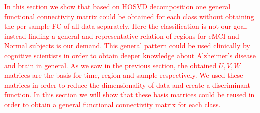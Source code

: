 \documentclass[preprint,12pt]{elsarticle}
\begin{document}

%	


\textcolor{red}{In this section we show that based on HOSVD decomposition one general functional connectivity matrix could be obtained for each class without obtaining the per-sample FC of all data separately. Here the classification is not our goal, instead  finding a general and representative
	relation of regions for eMCI and Normal subjects is our demand. This general pattern could be used clinically by  cognitive scientists in order to obtain deeper knowledge about Alzheimer's disease and brain in general.}
%
\textcolor{red}{As we saw in the previous section, the obtained $U,V,W$ matrices are the basis for time, region and sample respectively. We used these matrices in order to reduce the dimensionality of data and create a discriminant function. In this section we will show that these basis matrices could be reused in order to obtain a general functional connectivity matrix for each class.}   
\end{document}
